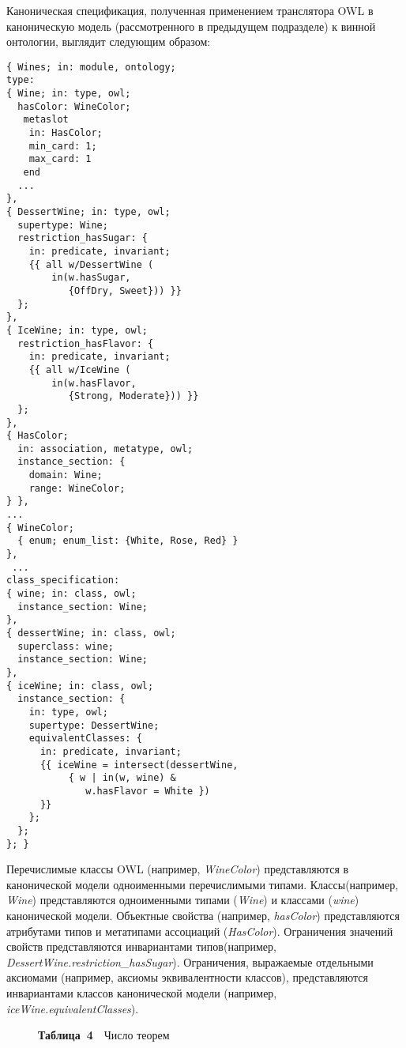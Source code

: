 \begin{multicols}{2}
Каноническая спецификация, полученная применением транслятора
OWL в каноническую модель (рассмотренного в предыдущем подразделе)
к винной онтологии, выглядит следующим образом:

{\small
\begin{verbatim}
{ Wines; in: module, ontology;
type:
{ Wine; in: type, owl;
  hasColor: WineColor;
   metaslot 
    in: HasColor;
    min_card: 1;
    max_card: 1
   end
  ...
},
{ DessertWine; in: type, owl;
  supertype: Wine;
  restriction_hasSugar: { 
    in: predicate, invariant;
    {{ all w/DessertWine (
        in(w.hasSugar,
           {OffDry, Sweet})) }}
  };
},
{ IceWine; in: type, owl;
  restriction_hasFlavor: { 
    in: predicate, invariant;
    {{ all w/IceWine (
        in(w.hasFlavor,
           {Strong, Moderate})) }}
  };
},
{ HasColor;
  in: association, metatype, owl;
  instance_section: {
    domain: Wine;
    range: WineColor; 
} },
...
{ WineColor;
  { enum; enum_list: {White, Rose, Red} }
},
 ...
class_specification:
{ wine; in: class, owl; 
  instance_section: Wine;
},
{ dessertWine; in: class, owl; 
  superclass: wine;
  instance_section: Wine;
},
{ iceWine; in: class, owl;   
  instance_section: {
    in: type, owl;
    supertype: DessertWine;
    equivalentClasses: {
      in: predicate, invariant;
      {{ iceWine = intersect(dessertWine, 
           { w | in(w, wine) &
              w.hasFlavor = White })
      }}
    };    
  };
}; }
\end{verbatim}
}

Перечислимые классы OWL (например, {\it WineColor}) представляются
в канонической модели одноименными перечислимыми типами.
Классы\linebreak (например, {\it Wine}) представляются
одноименными типами ({\it Wine}) и классами ({\it wine}) канонической модели.
Объектные свойства (например, {\it hasColor}) представляются
атрибутами типов и метатипами ассоциаций ({\it HasColor}).
Ограничения значений свойств представляются инвариантами
типов\linebreak (например, {\it DessertWine.restriction\_hasSugar}).
Ограничения, выражаемые отдельными аксиомами (например,
аксиомы эквивалентности классов), представляются
инвариантами классов канонической модели
(например, {\it iceWine.equivalentClasses}).

\begin{figure*} %
{\small
\begin{center}
\textbf{Таблица~4}\ \ Число теорем
\vspace*{2ex}


\end{center}}
\end{figure*}
\end{multicols}
